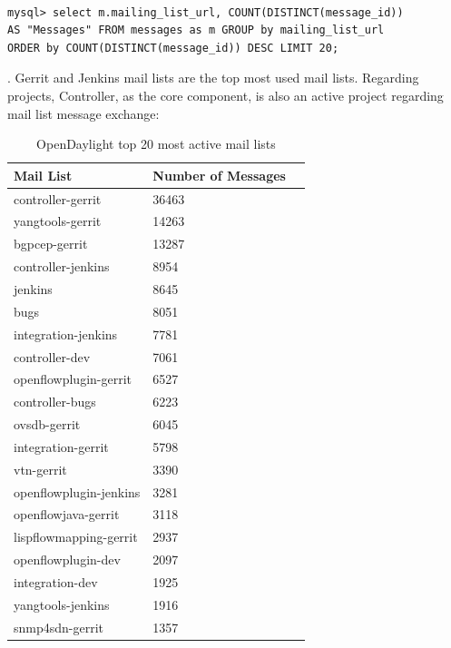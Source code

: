 \documentclass[a4paper, 12pt]{book}
\begin{document}
\begin{verbatim}

mysql> select m.mailing_list_url, COUNT(DISTINCT(message_id))
AS "Messages" FROM messages as m GROUP by mailing_list_url
ORDER by COUNT(DISTINCT(message_id)) DESC LIMIT 20;

\end{verbatim}
. Gerrit and Jenkins mail lists are the top most used mail lists. Regarding projects, Controller, as the core component, is also an active project regarding mail list message exchange:
\begin{table}[H]
\footnotesize
\begin{center}
\begin{tabular}{|l|l|p{3cm}|}
\hline
\textbf{Mail List} & \textbf{Number of Messages} \\ \hline
controller-gerrit & 36463 \\ \hline
yangtools-gerrit & 14263 \\ \hline
bgpcep-gerrit & 13287 \\ \hline
controller-jenkins & 8954 \\ \hline
jenkins & 8645 \\ \hline
bugs & 8051 \\ \hline
integration-jenkins & 7781 \\ \hline
controller-dev & 7061 \\ \hline
openflowplugin-gerrit & 6527 \\ \hline
controller-bugs & 6223 \\ \hline
ovsdb-gerrit & 6045 \\ \hline
integration-gerrit & 5798 \\ \hline
vtn-gerrit & 3390 \\ \hline
openflowplugin-jenkins & 3281 \\ \hline
openflowjava-gerrit & 3118 \\ \hline
lispflowmapping-gerrit & 2937 \\ \hline
openflowplugin-dev & 2097 \\ \hline
integration-dev & 1925 \\ \hline
yangtools-jenkins & 1916 \\ \hline
snmp4sdn-gerrit & 1357 \\ \hline
\end{tabular}
\end{center}
\caption{OpenDaylight top 20 most active mail lists}
\label{tab:odl_top_maillists}
\end{table}
\end{document}
